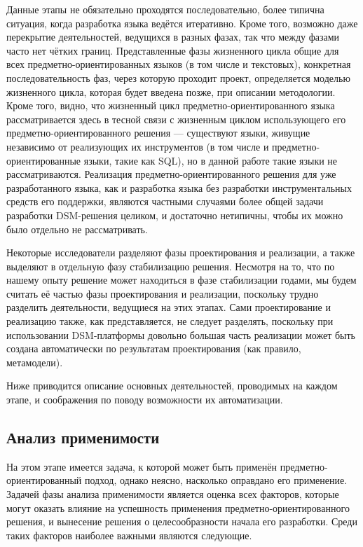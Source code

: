 Данные этапы не обязательно проходятся последовательно, более типична ситуация, когда 
разработка языка ведётся итеративно. Кроме того, возможно даже перекрытие деятельностей, 
ведущихся в разных фазах, так что между фазами часто нет чётких границ. Представленные 
фазы жизненного цикла общие для всех предметно-ориентированных языков (в том числе 
и текстовых), конкретная последовательность фаз, через которую проходит проект, определяется 
моделью жизненного цикла, которая будет введена позже, при описании методологии. Кроме 
того, видно, что жизненный цикл предметно-ориентированного языка рассматривается здесь 
в тесной связи с жизненным циклом использующего его предметно-ориентированного решения --- 
существуют языки, живущие независимо от реализующих их инструментов (в том числе и 
предметно-ориентированные языки, такие как SQL), но в данной работе такие языки не 
рассматриваются. Реализация предметно-ориентированного решения для уже разработанного 
языка, как и разработка языка без разработки инструментальных средств его поддержки, 
являются частными случаями более общей задачи разработки DSM-решения целиком, и достаточно 
нетипичны, чтобы их можно было отдельно не рассматривать.

Некоторые исследователи разделяют фазы проектирования и реализации, а также выделяют 
в отдельную фазу стабилизацию решения. Несмотря на то, что по нашему опыту решение 
может находиться в фазе стабилизации годами, мы будем считать её частью фазы проектирования 
и реализации, поскольку трудно разделить деятельности, ведущиеся на этих этапах. Сами 
проектирование и реализацию также, как представляется, не следует разделять, поскольку 
при использовании DSM-платформы довольно большая часть реализации может быть создана 
автоматически по результатам проектирования (как правило, метамодели).

Ниже приводится описание основных деятельностей, проводимых на каждом этапе, и соображения 
по поводу возможности их автоматизации.

\subsection{Анализ применимости}
\label{chapterFeasibilityStudy}
На этом этапе имеется задача, к которой может быть применён предметно-ориентированный 
подход, однако неясно, насколько оправдано его применение. Задачей фазы анализа применимости 
является оценка всех факторов, которые могут оказать влияние на успешность применения 
предметно-ориентированного решения, и вынесение решения о целесообразности начала 
его разработки. Среди таких факторов наиболее важными являются следующие.

